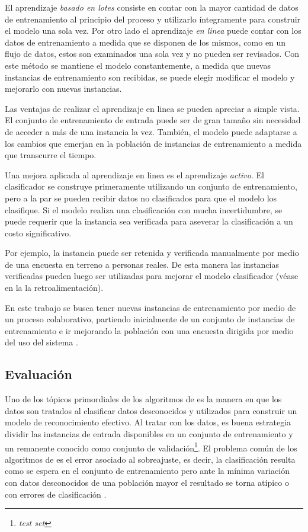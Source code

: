 El aprendizaje \emph{basado en lotes} consiste en contar con la mayor
cantidad de datos de entrenamiento al principio del proceso y utilizarlo
íntegramente para construir el modelo una sola vez. Por otro lado
el aprendizaje \emph{en linea} puede contar con los datos de entrenamiento
a medida que se disponen de los mismos, como en un flujo de datos,
estos son examinados una sola vez y no pueden ser revisados. Con este
método se mantiene el modelo constantemente, a medida que nuevas instancias
de entrenamiento son recibidas, se puede elegir modificar el modelo
y mejorarlo con nuevas instancias. 

Las ventajas de realizar el aprendizaje en linea se pueden apreciar
a simple vista. El conjunto de entrenamiento de entrada puede ser
de gran tamaño sin necesidad de acceder a más de una instancia la
vez. También, el modelo puede adaptarse a los cambios que emerjan
en la población de instancias de entrenamiento a medida que transcurre
el tiempo.

Una mejora aplicada al aprendizaje en linea es el aprendizaje \emph{activo}.
El clasificador se construye primeramente utilizando un conjunto de
entrenamiento, pero a la par se pueden recibir datos no clasificados
para que el modelo los clasifique. Si el modelo realiza una clasificación
con mucha incertidumbre, se puede requerir que la instancia sea verificada
para aseverar la clasificación a un costo significativo. 

Por ejemplo, la instancia puede ser retenida y verificada manualmente
por medio de una encuesta en terreno a personas reales. De esta manera
las instancias verificadas pueden luego ser utilizadas para mejorar
el modelo clasificador (véase en la 
la retroalimentación). 

En este trabajo se busca tener nuevas instancias de entrenamiento
por medio de un proceso colaborativo, partiendo inicialmente de un
conjunto de instancias de entrenamiento e ir mejorando la población
con una encuesta dirigida por medio del uso del sistema .

\subsection{Evaluación}

Uno de los tópicos primordiales de los algoritmos de  es
la manera en que los datos son tratados al clasificar datos desconocidos
y utilizados para construir un modelo de reconocimiento efectivo.
Al tratar con los datos, es buena estrategia dividir las instancias
de entrada disponibles en un conjunto de entrenamiento y un remanente
conocido como conjunto de validación\emph{}\footnote{\emph{test set}}.
El problema común de los algoritmos de  es el error asociado
al sobreajuste, es decir, la clasificación resulta como se espera
en el conjunto de entrenamiento pero ante la mínima variación con
datos desconocidos de una población mayor el resultado se torna atípico
o con errores de clasificación \cite{Rajaraman2011}. 

